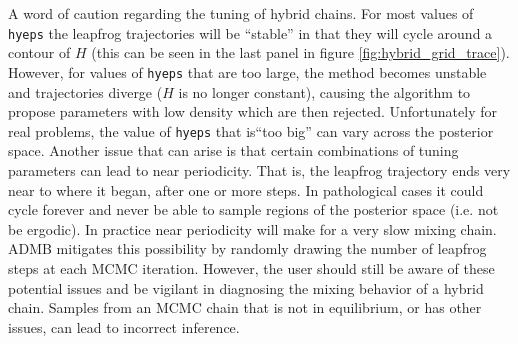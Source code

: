 \documentclass{article}\usepackage[]{graphicx}\usepackage[]{color}
\begin{document}
A word of caution regarding the tuning of hybrid chains. For most values of
\texttt{hyeps} the leapfrog trajectories will be ``stable'' in that they
will cycle around a contour of $H$ (this can be seen in the last panel in
figure \ref{fig:hybrid_grid_trace}). However, for values of \texttt{hyeps}
that are too large, the method becomes unstable and trajectories diverge
($H$ is no longer constant), causing the algorithm to propose parameters
with low density which are then rejected. Unfortunately for real problems,
the value of \texttt{hyeps} that is``too big'' can vary across the
posterior space.  Another issue that can arise is that certain combinations
of tuning parameters can lead to near periodicity. That is, the leapfrog
trajectory ends very near to where it began, after one or more steps. In
pathological cases it could cycle forever and never be able to sample
regions of the posterior space (i.e. not be ergodic). In practice near
periodicity will make for a very slow mixing chain. ADMB mitigates this
possibility by randomly drawing the number of leapfrog steps at each MCMC
iteration. However, the user should still be aware of these potential
issues and be vigilant in diagnosing the mixing behavior of a hybrid
chain. Samples from an MCMC chain that is not in equilibrium, or has other
issues, can lead to incorrect inference.



\end{document}
